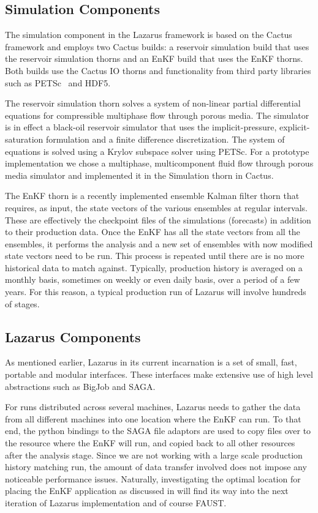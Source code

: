 \documentclass[conference,final]{IEEEtran}
\begin{document}
\subsection{Simulation Components}
The simulation component in the Lazarus framework is based on the
Cactus framework and employs two Cactus builds: a reservoir simulation
build that uses the reservoir simulation thorns and an EnKF build that
uses the EnKF thorns. Both builds use the Cactus IO thorns and
functionality from third party libraries such as PETSc~\cite{PETSc}
and HDF5.

The reservoir simulation thorn solves a system of non-linear partial
differential equations for compressible multiphase flow through porous
media. The simulator is in effect a black-oil reservoir simulator that
uses the implicit-pressure, explicit-saturation formulation and a
finite difference discretization. The system of equations is solved
using a Krylov subspace solver using PETSc. For a prototype
implementation we chose a multiphase, multicomponent fluid flow
through porous media simulator and implemented it in the Simulation
thorn in Cactus.

The EnKF thorn is a recently implemented ensemble Kalman filter
thorn that requires, as input, the state vectors of the various
ensembles at regular intervals. These are effectively the checkpoint
files of the simulations (forecasts) in addition to their production
data. Once the EnKF has all the state vectors from all the ensembles, 
it performs the analysis and a new set of ensembles with now modified
state vectors need to be run. This process is repeated until there
are is no more historical data to match against. Typically,
production history is averaged on a monthly basis, sometimes on weekly
or even daily basis, over a period of a few years. For this reason,
a typical production run of Lazarus will involve hundreds of stages.

\subsection{Lazarus Components}

As mentioned earlier, Lazarus in its current incarnation is a set of
small, fast, portable and modular interfaces. These interfaces make
extensive use of high level abstractions such as BigJob and SAGA.

For runs distributed across several machines, Lazarus needs to gather
the data from all different machines into one location where the EnKF
can run. To that end, the python bindings to the SAGA file adaptors
are used to copy files over to the resource where the EnKF will run,
and copied back to all other resources after the analysis stage. Since
we are not working with a large scale production history matching run,
the amount of data transfer involved does not impose any noticeable
performance issues. Naturally, investigating the optimal location for
placing the EnKF application as discussed in \cite{escience07} will
find its way into the next iteration of Lazarus implementation and of
course FAUST.
\end{document}
